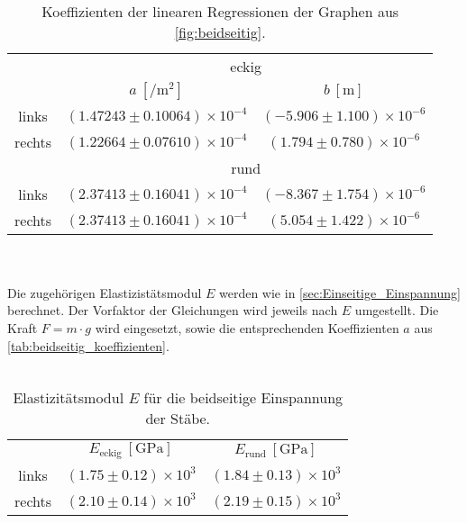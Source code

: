 \\
\begin{table}[h!]
    \centering
    \caption{Koeffizienten der linearen Regressionen der Graphen aus \autoref{fig:beidseitig}.}
    \label{tab:beidseitig_koeffizienten}
    \begin{tabular}{|c|c c|}
        \toprule
        & \multicolumn{2}{c}{eckig}\\
        \cmidrule(lr){2-3}
        & $a \:[\unit{\per\meter\squared}]$ & $b \:[\unit{\meter}]$\\%
        \midrule
        links & $(1.47243 \pm 0.10064)\times 10^{-4}$ & $(-5.906 \pm 1.100)\times 10^{-6}$\\%
        rechts & $(1.22664 \pm 0.07610)\times 10^{-4}$ & $(1.794 \pm 0.780)\times 10^{-6}$\\%
        \midrule
        &\multicolumn{2}{c}{rund}\\ 
        \cmidrule(lr){2-3}
        links & $(2.37413 \pm 0.16041)\times 10^{-4}$ & $(-8.367 \pm 1.754)\times 10^{-6}$ \\
        rechts & $(2.37413 \pm 0.16041)\times 10^{-4}$ & $(5.054 \pm 1.422)\times 10^{-6}$ \\
        \bottomrule
    \end{tabular}
\end{table}
\\
\\
Die zugehörigen Elastizistätsmodul $E$ werden wie in \autoref{sec:Einseitige_Einspannung} berechnet. Der Vorfaktor der Gleichungen %
wird jeweils nach $E$ umgestellt. Die Kraft $F = m \cdot g$ wird eingesetzt, sowie die entsprechenden Koeffizienten $a$ aus \autoref{tab:beidseitig_koeffizienten}.\\
\\
\begin{table}
    \centering
    \caption{Elastizitätsmodul $E$ für die beidseitige Einspannung der Stäbe.}
    \label{tab:beidseitig_E}
    \begin{tabular}{c|c c|}
        \toprule
        & $E_{\text{eckig}}\:[\unit{\giga\pascal}]$ & $E_{\text{rund}}\:[\unit{\giga\pascal}]$\\
        \cmidrule(lr){2-3}
        links & $(1.75 \pm 0.12)\times 10^3$ & $(1.84 \pm 0.13)\times 10^3$\\
        rechts & $(2.10 \pm 0.14)\times 10^3$ & $(2.19 \pm 0.15)\times 10^3$\\
        \bottomrule
    \end{tabular}
\end{table}
